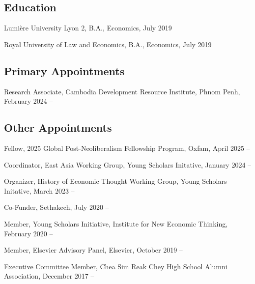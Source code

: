 \documentclass[10pt,a4paper]{article}
\begin{document}
\subsection*{Education}
	
	Lumière University Lyon 2, B.A., Economics, July 2019
	
	Royal University of Law and Economics, B.A., Economics, July 2019 
	

\subsection*{Primary Appointments}	


		Research Associate, Cambodia Development Resource Institute, Phnom Penh,  February 2024 --

\subsection*{Other Appointments}
	
	Fellow, 2025 Global Post-Neoliberalism Fellowship Program, Oxfam, April 2025 --
	
	Coordinator, East Asia Working Group, Young Scholars Initative, January 2024 --
	
	Organizer, History of Economic Thought Working Group, Young Scholars Initative, March 2023 --
	
	Co-Funder, Sethakech, July 2020 --
	
	Member, Young Scholars Initiative, Institute for New Economic Thinking, February 2020 --

	Member, Elsevier Advisory Panel, Elsevier, October 2019 --
	
	Executive Committee Member, Chea Sim Reak Chey High School Alumni Association, December 2017 --

	
\end{document}

